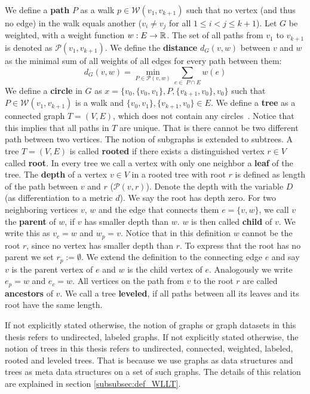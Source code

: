 	We define a \textbf{path} $P$ as a walk $p\in \mathcal{W}(v_1, v_{k+1})$ such that no vertex (and thus no edge) in the walk equals another ($v_i\neq v_j$ for all $1\le i<j\le k+1$).
	Let $G$ be weighted, with a weight function $w:E\to\mathbb{R}$.
	The set of all paths from $v_1$ to $v_{k+1}$ is denoted as $\mathcal{P}(v_1, v_{k+1})$. 
	We define the \textbf{distance} $d_G(v,w)$ between $v$ and $w$ as the minimal sum of all weights of all edges for every path between them:
	\[ d_G(v,w) = \min_{P\in \mathcal{P}(v,w)} \sum_{e\in \; P \cap E } w(e) \]
	We define a \textbf{circle} in $G$ as $x = \{ v_0, \{v_0, v_1\}, P, \{ v_{k+1}, v_0\}, v_{0} \}$ such that $P \in \mathcal{W}(v_1, v_{k+1})$ is a walk and $\{v_0, v_1\}, \{ v_{k+1}, v_0\}\in E$.
	We define a \textbf{tree} as a connected graph $T=(V, E)$, which does not contain any circles~\cite{2018_Korte_BOOK}. 
	Notice that this implies that all paths in $T$ are unique. 
	That is there cannot be two different path between two vertices.
	The notion of subgraphs is extended to subtrees.
	A tree $T=(V, E)$ is called \textbf{rooted} if there exists a distinguished vertex $r\in V$ called \textbf{root}.
	In every tree we call a vertex with only one neighbor a \textbf{leaf} of the tree.
	The \textbf{depth} of a vertex $v\in V$ in a rooted tree with root $r$ is defined as length of the path between $v$ and $r$ ($\mathcal{P}(v,r)$).
	Denote the depth with the variable $D$ (as differentiation to a metric $d$).
	We say the root has depth zero.
	For two neighboring vertices $v$, $w$ and the edge that connects them $e=\{v, w\}$, we call $v$ the \textbf{parent} of $w$, if $v$ has smaller depth than $w$.
	$w$ is then called \textbf{child} of $v$.
	We write this as $v_c = w$ and $w_p = v$.
	Notice that in this definition $w$ cannot be the root $r$, since no vertex has smaller depth than $r$. 
	To express that the root has no parent we set $r_p:=\emptyset$.
	We extend the definition to the connecting edge $e$ and say $v$ is the parent vertex of $e$ and $w$ is the child vertex of $e$.
	Analogously we write $e_p = w$ and $e_c = w$.
	All vertices on the path from $v$ to the root $r$ are called \textbf{ancestors} of $v$.
	We call a tree \textbf{leveled}, if all paths between all its leaves and its root have the same length.
	
	If not explicitly stated otherwise, the notion of graphs or graph datasets in this thesis refers to undirected, labeled graphs.
	If not explicitly stated otherwise, the notion of trees in this thesis refers to undirected, connected, weighted, labeled, rooted and leveled trees.
	That is because we use graphs as data structures and trees as meta data structures on a set of such graphs.
	The details of this relation are explained in section \ref{subsubsec:def_WLLT}.

